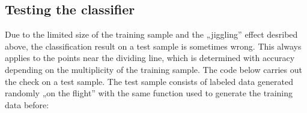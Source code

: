 \documentclass[a4paper,12pt,polish]{jupyterBook}
\begin{document}
\subsection{Testing the classifier}
\label{\detokenize{docs/perceptron:testing-the-classifier}}
\sphinxAtStartPar
Due to the limited size of the training sample and the „jiggling” effect desribed above, the classification result on a test sample is sometimes wrong. This always applies to the points near the dividing line, which is determined with accuracy depending on the multiplicity of the training sample. The code below carries out the check on a test sample. The test sample consists of labeled data generated randomly „on the flight” with the same function  used to generate the training data before:
\begin{sphinxVerbatimInput}

\begin{sphinxVerbatim}[commandchars=\\\{\}]
 
              
               
         \PYG{p}{[}\PYG{p}{]} 
                              
         \PYG{p}{[}\PYG{p}{]} 
\end{sphinxVerbatim}
\end{sphinxVerbatimInput}
\end{document}
